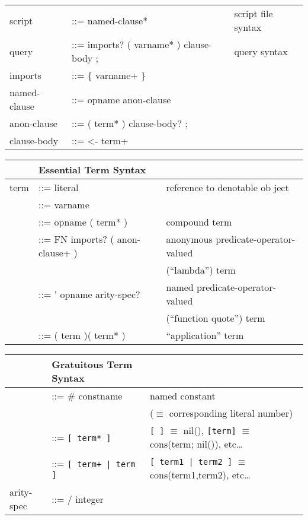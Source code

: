 \begin{tabular}{l l l}
script & ::= named-clause* & script file syntax \\
query & ::= imports? ( varname* ) clause-body ; & query syntax \\
imports & ::= \{ varname+ \} &\\
named-clause & ::= opname anon-clause &\\
anon-clause & ::= ( term* ) clause-body? ; &\\
clause-body & ::= <- term+ &\\
\end{tabular}

\begin{tabular}{l l l}
\hline
&Essential Term Syntax&\\
\hline
term & ::= literal & reference to denotable ob ject \\
& ::= varname &\\
& ::= opname ( term* ) & compound term \\
& ::= FN imports? ( anon-clause+ ) & anonymous predicate-operator-valued 
\\&&(``lambda'') term \\
& ::= ' opname arity-spec? & named predicate-operator-valued
\\&&(``function quote'') term \\
& ::= ( term )( term* ) & ``application'' term \\ 
\end{tabular}

\begin{tabular}{l l l}
\hline
&Gratuitous Term Syntax&\\
\hline
&::= \# constname & named constant\\&&($\equiv$ corresponding literal number)\\
&::= \verb|[ term* ]| & \verb|[ ]| $\equiv$ nil(), \verb|[term]| $\equiv$
cons(term; nil()), etc\ldots\\
&::= \verb$[ term+ | term ]$ & \verb$[ term1 | term2 ]$ $\equiv$
cons(term1,term2), etc\ldots\\
arity-spec & ::= / integer &\\ 
\end{tabular}

\secup

\secup